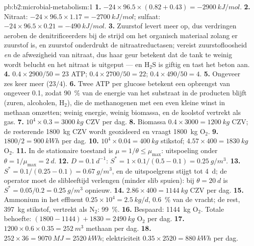\begin{solution}{pb:b2:microbial-metabolism:1}
\textbf{1.} $-24\times 96.5\times (0.82 + 0.43) = \qty{-2900}{kJ/mol}$.
\textbf{2.} Nitraat: $-24\times 96.5\times 1.17 = \qty{-2700}{kJ/mol}$;
sulfaat: $-24\times 96.5\times 0.21 = \qty{-490}{kJ/mol}$.
\textbf{3.} Zuurstof levert meer op, dus verdringen aeroben de
denitrificeerders bij de strijd om het organisch materiaal zolang er
zuurstof is, en zuurstof onderdrukt de nitraatreductasen; 
vereist zuurstofloosheid \emph{en} de afwezigheid van nitraat, dus haar
geur betekent dat de tank te weinig wordt belucht en het nitraat is
uitgeput --- en $\mathrm{H_2S}$ is giftig en tast het beton aan.
\textbf{4.} $0.4\times 2900/50 = 23$ ATP; $0.4\times 2700/50 = 22$;
$0.4\times 490/50 = 4$.
\textbf{5.} Ongeveer zes keer meer ($23/4$).
\textbf{6.} Twee ATP per glucose betekent een opbrengst van ongeveer
\num{0.1}, zodat \qty{90}{\%} van de energie van het substraat in de
producten blijft (zuren, alcoholen, $\mathrm{H_2}$), die de methanogenen
met een even kleine winst in methaan omzetten; weinig energie, weinig
biomassa, en de koolstof vertrekt als gas.
\textbf{7.} $10^4\times 0.3 = \qty{3000}{kg}$ CZV per dag.
\textbf{8.} Biomassa $0.4\times 3000 = \qty{1200}{kg}$ CZV; de
resterende \qty{1800}{kg} CZV wordt geoxideerd en vraagt \qty{1800}{kg}
$\mathrm{O_2}$.
\textbf{9.} $1800/2 = \qty{900}{kWh}$ per dag.
\textbf{10.} $10^4\times 0.04 = \qty{400}{kg}$ stikstof;
$4.57\times 400 = \qty{1830}{kg}$ $\mathrm{O_2}$.
\textbf{11.} In de stationaire toestand is $\mu = 1/\theta \le \mu_{\max}$:
uitspoeling onder $\theta = 1/\mu_{\max} = \qty{2}{d}$.
\textbf{12.} $D = \qty{0.1}{d^{-1}}$: $S^* = 1\times 0.1/(0.5 - 0.1)
= \qty{0.25}{g/m^3}$.
\textbf{13.} $S^* = 0.1/(0.25 - 0.1) = \qty{0.67}{g/m^3}$, en de
uitspoelgrens stijgt tot \qty{4}{d}; de operator moet de slibleeftijd
verlengen (minder slib spuien): bij $\theta = \qty{20}{d}$ is $S^* =
0.05/0.2 = \qty{0.25}{g/m^3}$ opnieuw.
\textbf{14.} $2.86\times 400 = \qty{1144}{kg}$ CZV per dag.
\textbf{15.} Ammonium in het effluent $0.25\times 10^4 = \qty{2.5}{kg/d}$,
\qty{0.6}{\%} van de vracht; de rest, \qty{397}{kg} stikstof,
vertrekt als $\mathrm{N_2}$: \qty{99}{\%}.
\textbf{16.} Bespaard: \qty{1144}{kg} $\mathrm{O_2}$. Totale behoefte:
$(1800 - 1144) + 1830 = \qty{2490}{kg}$ $\mathrm{O_2}$ per dag.
\textbf{17.} $1200\times 0.6\times 0.35 = \qty{252}{m^3}$ methaan
per dag.
\textbf{18.} $252\times 36 = \qty{9070}{MJ} = \qty{2520}{kWh}$;
elektriciteit $0.35\times 2520 = \qty{880}{kWh}$ per dag.

\end{solution}
